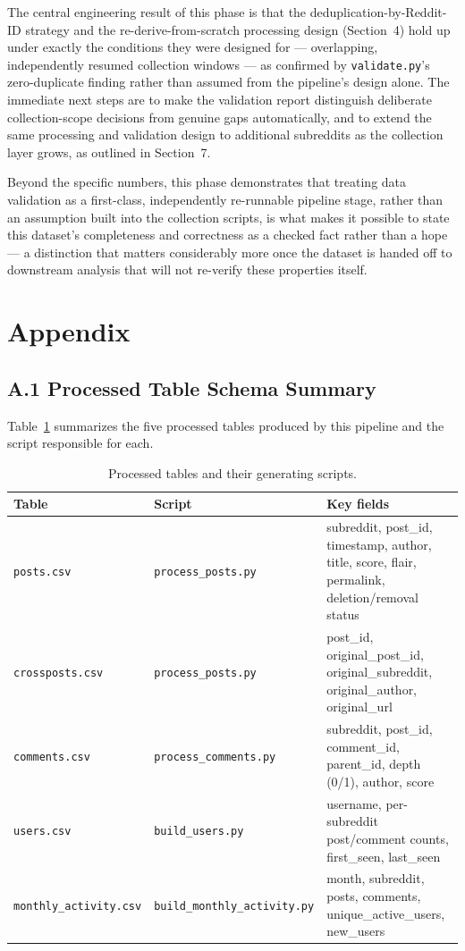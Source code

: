 \documentclass[12pt]{article}
\begin{document}
The central engineering result of this phase is that the deduplication-by-Reddit-ID strategy and
the re-derive-from-scratch processing design (Section~4) hold up under exactly the conditions
they were designed for — overlapping, independently resumed collection windows — as confirmed
by \texttt{validate.py}'s zero-duplicate finding rather than assumed from the pipeline's design
alone. The immediate next steps are to make the validation report distinguish deliberate
collection-scope decisions from genuine gaps automatically, and to extend the same processing and
validation design to additional subreddits as the collection layer grows, as outlined in
Section~7.

Beyond the specific numbers, this phase demonstrates that treating data validation as a first-class,
independently re-runnable pipeline stage, rather than an assumption built into the collection
scripts, is what makes it possible to state this dataset's completeness and correctness as a
checked fact rather than a hope — a distinction that matters considerably more once the dataset
is handed off to downstream analysis that will not re-verify these properties itself.


\section{Appendix}

\subsection*{A.1 Processed Table Schema Summary}
Table~\ref{tab:schema} summarizes the five processed tables produced by this pipeline and the
script responsible for each.

\begin{table}[h]
\centering
\small
\caption{Processed tables and their generating scripts.}
\label{tab:schema}
\begin{tabular}{@{}llp{6.3cm}@{}}
\toprule
\textbf{Table} & \textbf{Script} & \textbf{Key fields} \\
\midrule
\texttt{posts.csv} & \texttt{process\_posts.py} & subreddit, post\_id, timestamp, author, title,
score, flair, permalink, deletion/removal status \\
\texttt{crossposts.csv} & \texttt{process\_posts.py} & post\_id, original\_post\_id,
original\_subreddit, original\_author, original\_url \\
\texttt{comments.csv} & \texttt{process\_comments.py} & subreddit, post\_id, comment\_id,
parent\_id, depth (0/1), author, score \\
\texttt{users.csv} & \texttt{build\_users.py} & username, per-subreddit post/comment counts,
first\_seen, last\_seen \\
\texttt{monthly\_activity.csv} & \texttt{build\_monthly\_activity.py} & month, subreddit, posts,
comments, unique\_active\_users, new\_users \\
\bottomrule
\end{tabular}
\end{table}
\end{document}
